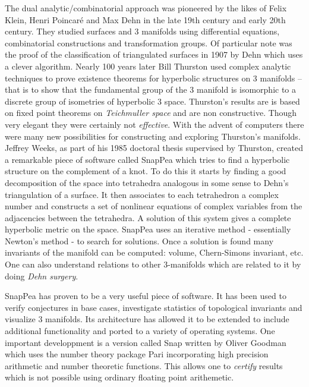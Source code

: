 \documentclass[14pt,fleqn]{article}
\begin{document}
The dual analytic/combinatorial approach was pioneered by the likes of Felix Klein, Henri Poincaré and Max Dehn in the late 19th century and early 20th century.
They studied surfaces
 and 3  manifolds using  
differential equations,
combinatorial constructions
and transformation groups.
Of particular note was the proof of  the classification of triangulated surfaces in 1907 by Dehn which uses a clever algorithm. 
Nearly 100 years later Bill Thurston
used complex analytic techniques to prove
existence theorems 
for hyperbolic structures on 3 manifolds
\cite{Thu1}
-- that is to show that the fundamental group of the 3 manifold is isomorphic
to a discrete group of isometries of 
hyperbolic 3 space.
Thurston's results are 
is based on fixed point 
theorems on \textit{Teichmuller space}
and are non constructive.
Though very elegant 
they were certainly not \textit{effective}.
With the advent of computers 
there were many new possibilities
for constructing and exploring Thurston's manifolds.
Jeffrey Weeks,  as part of his 1985 doctoral thesis
supervised by Thurston,
created a remarkable piece of software called SnapPea which tries to find a
hyperbolic structure on the complement of a knot.
To do this it starts  by finding a good  decomposition of the  space into tetrahedra analogous in some sense 
to Dehn's triangulation of a surface.
It then associates to each tetrahedron a complex number 
and constructs a
set of nonlinear equations of complex variables from the adjacencies between the tetrahedra.
A solution of this system  gives a complete hyperbolic metric on the space.
SnapPea  uses an iterative method -  essentially Newton's method - to search for solutions. 
Once a solution is found many 
invariants of the manifold can be computed: volume, Chern-Simons invariant, etc.
One can also understand relations to other 3-manifolds which are related to it 
 by doing \textit{Dehn surgery}.
 
SnapPea has proven to be a very useful piece of software. It has been used to verify conjectures in base cases, 
investigate statistics of topological invariants and visualize 3 manifolds.
Its architecture has allowed it to be extended to include additional functionality
\cite{snappy} and ported to a variety of operating systems.
One important developpment is a version
called Snap written by Oliver Goodman \cite{snap}
which uses  the number theory package Pari incorporating  high precision arithmetic and number theoretic functions. 
This allows one to \textit{certify}
results 
which is not possible using
ordinary floating point arithemetic.
\end{document}
